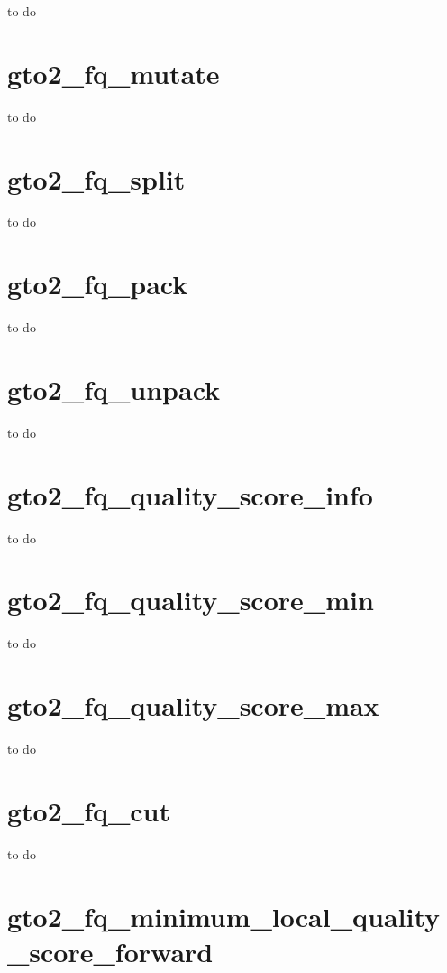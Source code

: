 \documentclass[11pt,]{krantz}
\begin{document}
to do

\section{gto2\_fq\_mutate}\label{gto2_fq_mutate}

to do

\section{gto2\_fq\_split}\label{gto2_fq_split}

to do

\section{gto2\_fq\_pack}\label{gto2_fq_pack}

to do

\section{gto2\_fq\_unpack}\label{gto2_fq_unpack}

to do

\section{gto2\_fq\_quality\_score\_info}\label{gto2_fq_quality_score_info}

to do

\section{gto2\_fq\_quality\_score\_min}\label{gto2_fq_quality_score_min}

to do

\section{gto2\_fq\_quality\_score\_max}\label{gto2_fq_quality_score_max}

to do

\section{gto2\_fq\_cut}\label{gto2_fq_cut}

to do

\section{gto2\_fq\_minimum\_local\_quality\_score\_forward}\label{gto2_fq_minimum_local_quality_score_forward}
\end{document}
